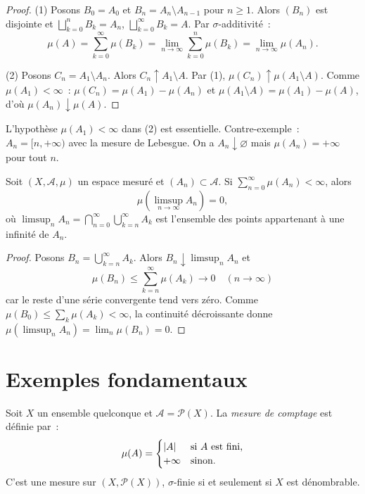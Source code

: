 \begin{proof}
(1) Posons $B_0 = A_0$ et $B_n = A_n \setminus A_{n-1}$ pour $n \geq 1$. Alors
$(B_n)$ est disjointe et $\bigsqcup_{k=0}^n B_k = A_n$, $\bigsqcup_{k=0}^\infty
B_k = A$. Par $\sigma$-additivit\'e~:
\[
\mu(A) = \sum_{k=0}^{\infty} \mu(B_k) = \lim_{n \to \infty} \sum_{k=0}^n \mu(B_k)
= \lim_{n \to \infty} \mu(A_n).
\]

(2) Posons $C_n = A_1 \setminus A_n$. Alors $C_n \uparrow A_1 \setminus A$.
Par (1), $\mu(C_n) \uparrow \mu(A_1 \setminus A)$. Comme $\mu(A_1) < \infty$~:
$\mu(C_n) = \mu(A_1) - \mu(A_n)$ et $\mu(A_1 \setminus A) = \mu(A_1) - \mu(A)$,
d'o\`u $\mu(A_n) \downarrow \mu(A)$.
\end{proof}

\begin{attention}[title=\textbf{Condition de finitude}]
L'hypoth\`ese $\mu(A_1) < \infty$ dans (2) est essentielle. Contre-exemple~:
$A_n = [n, +\infty)$ avec la mesure de Lebesgue. On a $A_n \downarrow \varnothing$
mais $\mu(A_n) = +\infty$ pour tout $n$.
\end{attention}

\begin{lemme}
\label{lem:borel_cantelli}
Soit $(X, \mathcal{A}, \mu)$ un espace mesur\'e et $(A_n) \subset \mathcal{A}$. Si
$\sum_{n=0}^{\infty} \mu(A_n) < \infty$, alors
\[
\mu\!\left(\limsup_{n \to \infty} A_n\right) = 0,
\]
o\`u $\limsup_n A_n = \bigcap_{n=0}^{\infty} \bigcup_{k=n}^{\infty} A_k$ est
l'ensemble des points appartenant \`a une infinit\'e de $A_n$.
\end{lemme}

\begin{proof}
Posons $B_n = \bigcup_{k=n}^{\infty} A_k$. Alors $B_n \downarrow \limsup_n A_n$ et
\[
\mu(B_n) \leq \sum_{k=n}^{\infty} \mu(A_k) \to 0 \quad (n \to \infty)
\]
car le reste d'une s\'erie convergente tend vers z\'ero. Comme $\mu(B_0) \leq
\sum_k \mu(A_k) < \infty$, la continuit\'e d\'ecroissante donne
$\mu(\limsup_n A_n) = \lim_n \mu(B_n) = 0$.
\end{proof}

\section{Exemples fondamentaux}

\begin{exemple}
Soit $X$ un ensemble quelconque et $\mathcal{A} = \mathcal{P}(X)$. La \emph{mesure
de comptage} est d\'efinie par~:
\[
\mu(A) = \begin{cases} \left| A \right| & \text{si } A \text{ est fini,} \\
+\infty & \text{sinon.} \end{cases}
\]
C'est une mesure sur $(X, \mathcal{P}(X))$, $\sigma$-finie si et seulement si $X$
est d\'enombrable.
\end{exemple}


